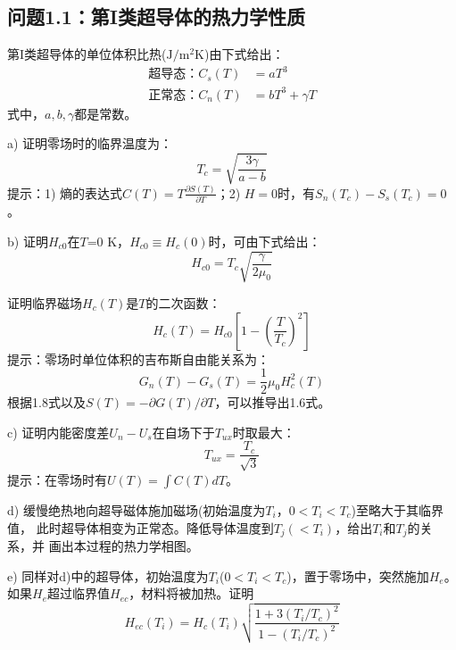 \subsection{问题1.1：第I类超导体的热力学性质}
第I类超导体的单位体积比热($\mathrm{J/m^2K}$)由下式给出：
\begin{subequations}\label{eqn:1.4ab}
	\begin{align}
\mbox{超导态：} C_s(T) &= aT^3 \\
\mbox{正常态：} C_n(T)&= bT^3+\gamma T	
	\end{align}
\end{subequations}
式中，$a,b,\gamma$都是常数。

a) 证明零场时的临界温度为：
\begin{equation}\label{eqn:1.5}
  T_c=\sqrt{\frac{3\gamma}{a-b}}
\end{equation}
提示：1) 熵的表达式$C(T)=T\frac{\partial S(T)}{\partial T}$；2) $H=0$时，有$S_n(T_c)-S_s(T_c)=0$。

b) 证明$H_{c0}$在$T$=0 K，$H_{c0}\equiv H_c(0)$时，可由下式给出：
\begin{equation}\label{eqn:1.6}
  H_{c0}=T_c \sqrt{\frac{\gamma}{2\mu_0}}
\end{equation}

证明临界磁场$H_c(T)$是$T$的二次函数：
\begin{equation}\label{eqn:1.7}
  H_c(T)=H_{c0}\left[1-\left(\frac{T}{T_c}\right)^2\right]
\end{equation}
提示：零场时单位体积的吉布斯自由能关系为：
\begin{equation}\label{eqn:1.8}
  G_n(T)-G_s(T)=\frac{1}{2}\mu_0 H_c^2(T)
\end{equation}
根据1.8式以及$S(T)=-\partial G(T)/\partial T$，可以推导出1.6式。

c) 证明内能密度差$U_n-U_s$在自场下于$T_{ux}$时取最大：
\begin{equation}
  T_{ux}=\frac{T_c}{\sqrt{3}}
\end{equation}
提示：在零场时有$U(T)=\int C(T)dT$。

d) 缓慢绝热地向超导磁体施加磁场(初始温度为$T_i$，$0<T_i<T_c$)至略大于其临界值，
此时超导体相变为正常态。降低导体温度到$T_j (<T_i)$，给出$T_i$和$T_j$的关系，并
画出本过程的热力学相图。

e) 同样对d)中的超导体，初始温度为$T_i$($0<T_i<T_c$)，置于零场中，突然施加$H_e$。
如果$H_e$超过临界值$H_{ec}$，材料将被加热。证明
\begin{equation}
  H_{ec}(T_i)=H_c(T _i)\sqrt{\frac{1+3(T_i/T_c)^2}{1-(T_i/T_c)^2}}
\end{equation}

